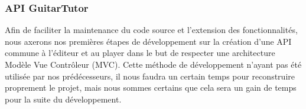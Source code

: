 \subsubsection*{API GuitarTutor}

Afin de faciliter la maintenance du code source et l'extension des fonctionnalités, nous axerons nos premières étapes de développement sur la création d'une API commune à l'éditeur et au player dans le but de respecter une architecture Modèle Vue Contrôleur (MVC). Cette méthode de développement n'ayant pas été utilisée par nos prédécesseurs, il nous faudra un certain temps pour reconstruire proprement le projet, mais nous sommes certains que cela sera un gain de temps pour la suite du développement.
